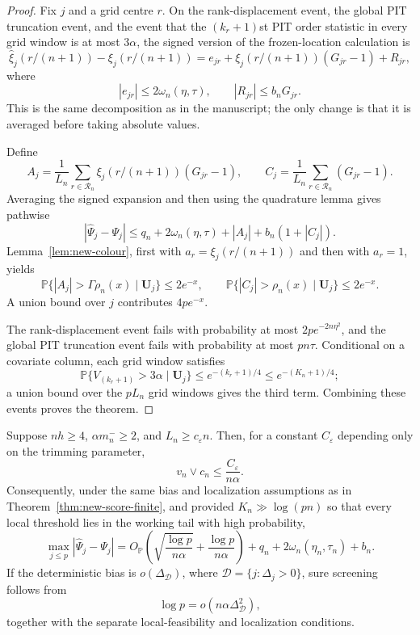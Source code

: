 \begin{proof}
Fix $j$ and a grid centre $r$. On the rank-displacement event, the global
PIT truncation event, and the event that the $(k_r+1)$st PIT order statistic
in every grid window is at most $3\alpha$, the signed version of the
frozen-location calculation is
\[
 \widehat\xi_j(r/(n+1))-\xi_j(r/(n+1))
 =e_{jr}+\xi_j(r/(n+1))(G_{jr}-1)+R_{jr},
\]
where
\[
 |e_{jr}|\le2\omega_n(\eta,\tau),
 \qquad
 |R_{jr}|\le b_nG_{jr}.
\]
This is the same decomposition as in the manuscript; the only change is
that it is averaged before taking absolute values.

Define
\[
 A_j=\frac1{L_n}\sum_{r\in\mathcal R_n}
       \xi_j(r/(n+1))(G_{jr}-1),
 \qquad
 C_j=\frac1{L_n}\sum_{r\in\mathcal R_n}(G_{jr}-1).
\]
Averaging the signed expansion and then using the quadrature lemma gives
pathwise
\[
 |\widehat\Psi_j-\Psi_j|
 \le q_n+2\omega_n(\eta,\tau)+|A_j|+b_n(1+|C_j|).
\]
Lemma~\ref{lem:new-colour}, first with
$a_r=\xi_j(r/(n+1))$ and then with $a_r=1$, yields
\[
 \mathbb P\{|A_j|>\Gamma\rho_n(x)\mid\boldsymbol U_j\}\le2e^{-x},
 \qquad
 \mathbb P\{|C_j|>\rho_n(x)\mid\boldsymbol U_j\}\le2e^{-x}.
\]
A union bound over $j$ contributes $4pe^{-x}$.

The rank-displacement event fails with probability at most
$2pe^{-2n\eta^2}$, and the global PIT truncation event fails with
probability at most $pn\tau$. Conditional on a covariate column, each grid
window satisfies
\[
 \mathbb P\{V_{(k_r+1)}>3\alpha\mid\boldsymbol U_j\}
 \le e^{-(k_r+1)/4}\le e^{-(K_n+1)/4};
\]
a union bound over the $pL_n$ grid windows gives the third term. Combining
these events proves the theorem.
\end{proof}

\begin{corollary}
\label{cor:new-score-rate}
Suppose $nh\ge4$, $\alpha m_n^-\ge2$, and $L_n\ge c_\varepsilon n$.
Then, for a constant $C_\varepsilon$ depending only on the trimming
parameter,
\[
 v_n\vee c_n\le \frac{C_\varepsilon}{n\alpha}.
\]
Consequently, under the same bias and localization assumptions as in
Theorem~\ref{thm:new-score-finite}, and provided
$K_n\gg\log(pn)$ so that every local threshold lies in the working tail
with high probability,
\[
 \max_{j\le p}|\widehat\Psi_j-\Psi_j|
 =O_{\mathbb P}\!\left(
   \sqrt{\frac{\log p}{n\alpha}}
   +\frac{\log p}{n\alpha}
  \right)
 +q_n+2\omega_n(\eta_n,\tau_n)+b_n.
\]
If the deterministic bias is $o(\Delta_{\mathcal D})$, where
$\mathcal D=\{j:\Delta_j>0\}$, sure screening follows from
\[
 \log p=o(n\alpha\Delta_{\mathcal D}^2),
\]
together with the separate local-feasibility and localization conditions.
\end{corollary}

